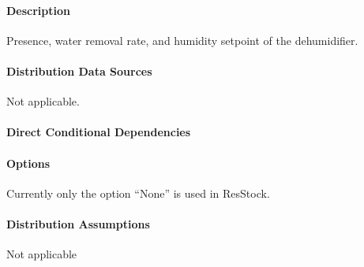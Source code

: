 \paragraph{Description}
% 
Presence, water removal rate, and humidity setpoint of the dehumidifier. 

\paragraph{Distribution Data Sources}
% 
Not applicable.

\paragraph{Direct Conditional Dependencies}


\paragraph{Options}
Currently only the option ``None'' is used in ResStock.

\paragraph{Distribution Assumptions}
% 
Not applicable
